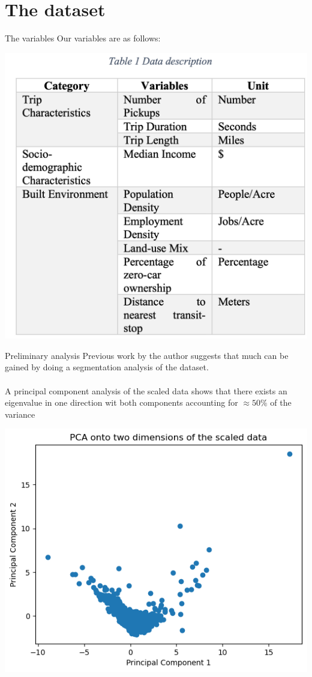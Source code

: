 \documentclass{beamer}
\begin{document}
\section{The dataset}
\begin{frame}{The variables}
	Our variables are as follows:
	\begin{center}
	\includegraphics[scale=0.3]{variables.png}
	\end{center}
\end{frame}
\begin{frame}{Preliminary analysis}
	Previous work by the author suggests that much can be gained by doing a segmentation analysis of the dataset. \\~\\
	A principal component analysis of the scaled data shows that there exists an eigenvalue in one direction wit both components accounting for $\approx 50\%$ of the variance
	\begin{center}
	\includegraphics[scale=0.45]{pca-w.png}
	\end{center}
\end{frame}
\end{document}
